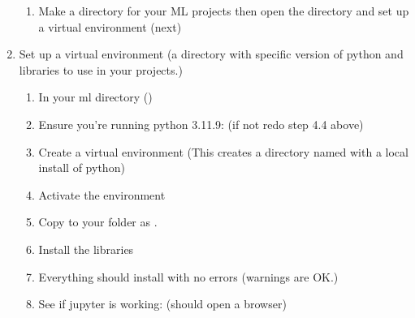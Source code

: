 \documentclass[letterpaper,10pt,english]{jupyterBook}
\begin{document}
\begin{enumerate}
\begin{enumerate}
\item {} 
\sphinxAtStartPar
Make a directory for your ML projects  then open the directory  and set up a virtual environment (next)

\end{enumerate}

\item {} 
\sphinxAtStartPar
Set up a virtual environment (a directory with specific version of python and libraries to use in your projects.)
\begin{enumerate}
%
\item {} 
\sphinxAtStartPar
In your ml directory ()

\item {} 
\sphinxAtStartPar
Ensure you’re running python 3.11.9:  (if not redo step 4.4 above)

\item {} 
\sphinxAtStartPar
Create a virtual environment  (This creates a directory named  with a local install of python)

\item {} 
\sphinxAtStartPar
Activate the environment 

\item {} 
\sphinxAtStartPar
Copy  to your folder  as .

\item {} 
\sphinxAtStartPar
Install the libraries 

\item {} 
\sphinxAtStartPar
Everything should install with no errors (warnings are OK.)

\item {} 
\sphinxAtStartPar
See if jupyter is working:  (should open a browser)

\end{enumerate}

\end{enumerate}
\end{document}
